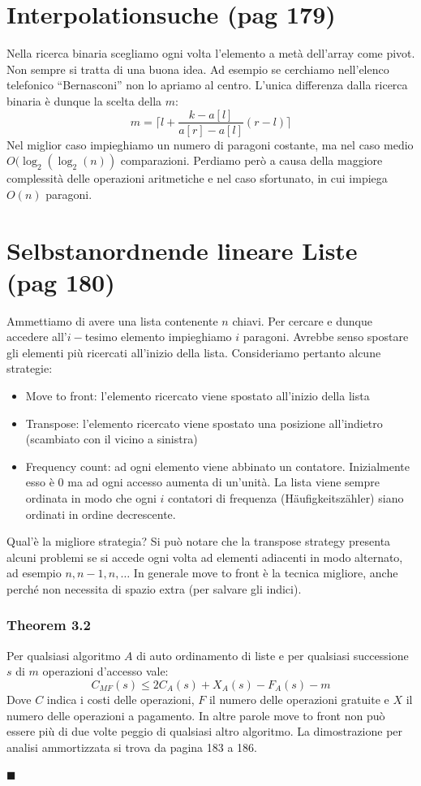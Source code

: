 \documentclass[a4paper]{book}
\newenvironment{mytheorem}[1]{\subsubsection*{Theorem #1}}{\begin{flushright}$\blacksquare$\end{flushright}}
\begin{document}
\section{Interpolationsuche (pag 179)}
Nella ricerca binaria scegliamo ogni volta l'elemento a metà dell'array come pivot. Non sempre si tratta di una buona idea. Ad esempio se cerchiamo nell'elenco telefonico ``Bernasconi'' non lo apriamo al centro. L'unica differenza dalla ricerca binaria è dunque la scelta della $m$:
$$m= \lceil l+ \frac{k-a[l]}{a[r]-a[l]}(r-l) \rceil$$
Nel miglior caso impieghiamo un numero di paragoni costante, ma nel caso medio $O(\log_2(\log_2(n))$ comparazioni. Perdiamo però a causa della maggiore complessità delle operazioni aritmetiche e nel caso sfortunato, in cui impiega $O(n)$ paragoni.
\section{Selbstanordnende lineare Liste (pag 180)}
Ammettiamo di avere una lista contenente $n$ chiavi. Per cercare e dunque accedere all'$i-$tesimo elemento impieghiamo $i$ paragoni. Avrebbe senso spostare gli elementi più ricercati all'inizio della lista. Consideriamo pertanto alcune strategie: 
\begin{itemize}
\item Move to front: l'elemento ricercato viene spostato all'inizio della lista
\item Transpose: l'elemento ricercato viene spostato una posizione all'indietro (scambiato con il vicino a sinistra)
\item Frequency count: ad ogni elemento viene abbinato un contatore. Inizialmente esso è 0 ma ad ogni accesso aumenta di un'unità. La lista viene sempre ordinata in modo che ogni $i$ contatori di frequenza (Häufigkeitszähler) siano ordinati in ordine decrescente. 
\end{itemize}
Qual'è la migliore strategia? Si può notare che la transpose strategy presenta alcuni problemi se si accede ogni volta ad elementi adiacenti in modo alternato, ad esempio $n,n-1,n,\dots$ In generale move to front è la tecnica migliore, anche perché non necessita di spazio extra (per salvare gli indici).
\begin{mytheorem}{3.2}
Per qualsiasi algoritmo $A$ di auto ordinamento di liste e per qualsiasi successione $s$ di $m$ operazioni d'accesso vale:
$$ C_{MF}(s) \leq 2C_A(s)+X_A(s)-F_A(s)-m $$
Dove $C$ indica i costi delle operazioni, $F$ il numero delle operazioni gratuite e $X$ il numero delle operazioni a pagamento. In altre parole move to front non può essere più di due volte peggio di qualsiasi altro algoritmo. La dimostrazione per analisi ammortizzata si trova da pagina 183 a 186.
\end{mytheorem}
\end{document}
